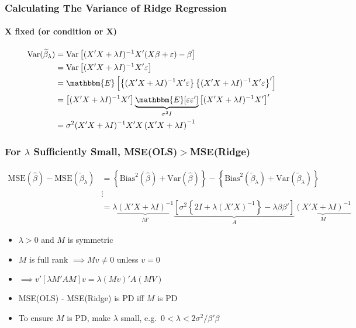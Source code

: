 \begin{frame}
  \frametitle{Calculating The Variance of Ridge Regression}
  \framesubtitle{X fixed (or condition or X)}

  \begin{align*}
    \text{Var}(\widetilde{\beta}_\lambda ) &= \text{Var}\left[ (X'X + \lambda I)^{-1} X'(X\beta + \varepsilon) - \beta \right]\\
    &= \text{Var}\left[ (X'X + \lambda I)^{-1}X' \varepsilon \right]\\
    &= \mathbbm{E}\left[ \left\{(X'X + \lambda I)^{-1}X' \varepsilon \right\}\left\{ (X'X + \lambda I)^{-1}X' \varepsilon \right\}'\right]\\
    &= \left[(X'X + \lambda I)^{-1} X'\right] \underbrace{\mathbbm{E}[\varepsilon \varepsilon']}_{\sigma^2 I} \left[(X'X + \lambda I)^{-1} X'\right]'\\
    &= \sigma^2 (X'X + \lambda I)^{-1} X'X \left( X'X + \lambda I \right)^{-1}
  \end{align*}

\end{frame}
\begin{frame}
  \frametitle{For $\lambda$ Sufficiently Small, MSE(OLS)$>$MSE(Ridge)}
  \scriptsize
\begin{align*}
  \text{MSE}(\widehat{\beta}) - \text{MSE}(\widetilde{\beta}_{\lambda}) &= \left\{ \text{Bias}^2(\widehat{\beta}) + \text{Var}(\widehat{\beta}) \right\} - \left\{ \text{Bias}^2(\widetilde{\beta}_\lambda) + \text{Var}(\widetilde{\beta}_\lambda) \right\}\\
  &\vdots \\
  &= \lambda \underbrace{(X'X + \lambda I)^{-1}}_{M'}\underbrace{\left[\sigma^2 \left\{ 2I + \lambda(X'X)^{-1} \right\} - \lambda \beta \beta'  \right]}_{A}\underbrace{\left( X'X + \lambda I \right)^{-1}}_{M}
\end{align*}
\normalsize

\begin{itemize}
  \item $\lambda > 0$ and $M$ is symmetric
  \item $M$ is full rank $\implies Mv \neq 0$ unless $v = 0$
  \item $\implies v'[\lambda M'AM] v = \lambda (Mv)' A (MV)$
  \item MSE(OLS) - MSE(Ridge) is PD iff $M$ is PD
  \item To ensure $M$ is PD, make $\lambda$ small, e.g.\ $0 < \lambda < 2\sigma^2/\beta'\beta$
\end{itemize}

\end{frame}
